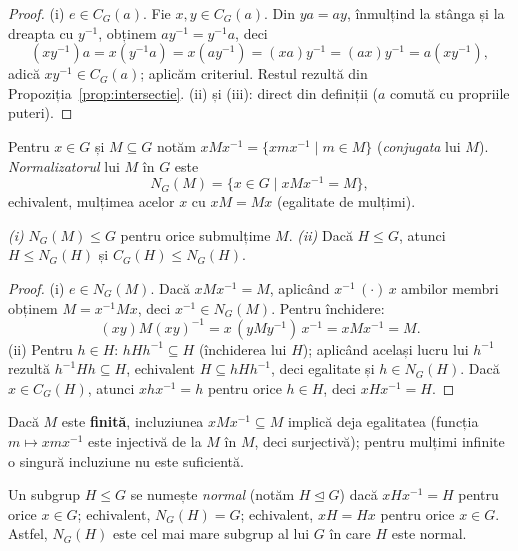 \begin{proof}
(i) $e\in C_G(a)$. Fie $x,y\in C_G(a)$. Din $ya=ay$, înmulțind la stânga și la dreapta cu $y^{-1}$, obținem $ay^{-1}=y^{-1}a$, deci
\[
(xy^{-1})a=x(y^{-1}a)=x(ay^{-1})=(xa)y^{-1}=(ax)y^{-1}=a(xy^{-1}),
\]
adică $xy^{-1}\in C_G(a)$; aplicăm criteriul. Restul rezultă din Propoziția~\ref{prop:intersectie}. (ii) și (iii): direct din definiții ($a$ comută cu propriile puteri).
\end{proof}

\begin{definitie}[normalizator]
Pentru $x\in G$ și $M\subseteq G$ notăm $xMx^{-1}=\{xmx^{-1}\mid m\in M\}$ (\emph{conjugata} lui $M$). \emph{Normalizatorul} lui $M$ în $G$ este
\[
N_G(M)=\{x\in G\mid xMx^{-1}=M\},
\]
echivalent, mulțimea acelor $x$ cu $xM=Mx$ (egalitate de mulțimi).
\end{definitie}

\begin{propozitie}\label{prop:normalizator}
\emph{(i)} $N_G(M)\le G$ pentru orice submulțime $M$.
\emph{(ii)} Dacă $H\le G$, atunci $H\le N_G(H)$ și $C_G(H)\le N_G(H)$.
\end{propozitie}

\begin{proof}
(i) $e\in N_G(M)$. Dacă $xMx^{-1}=M$, aplicând $x^{-1}\,(\cdot)\,x$ ambilor membri obținem $M=x^{-1}Mx$, deci $x^{-1}\in N_G(M)$. Pentru închidere:
\[
(xy)M(xy)^{-1}=x\,(yMy^{-1})\,x^{-1}=xMx^{-1}=M.
\]
(ii) Pentru $h\in H$: $hHh^{-1}\subseteq H$ (închiderea lui $H$); aplicând același lucru lui $h^{-1}$ rezultă $h^{-1}Hh\subseteq H$, echivalent $H\subseteq hHh^{-1}$, deci egalitate și $h\in N_G(H)$. Dacă $x\in C_G(H)$, atunci $xhx^{-1}=h$ pentru orice $h\in H$, deci $xHx^{-1}=H$.
\end{proof}

\begin{observatie}
Dacă $M$ este \textbf{finită}, incluziunea $xMx^{-1}\subseteq M$ implică deja egalitatea (funcția $m\mapsto xmx^{-1}$ este injectivă de la $M$ în $M$, deci surjectivă); pentru mulțimi infinite o singură incluziune nu este suficientă.
\end{observatie}

\begin{definitie}\label{def:normal}
Un subgrup $H\le G$ se numește \emph{normal} (notăm $H\trianglelefteq G$) dacă $xHx^{-1}=H$ pentru orice $x\in G$; echivalent, $N_G(H)=G$; echivalent, $xH=Hx$ pentru orice $x\in G$. Astfel, $N_G(H)$ este cel mai mare subgrup al lui $G$ în care $H$ este normal.
\end{definitie}

